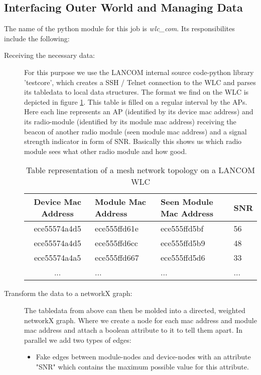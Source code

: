     \subsection{Interfacing Outer World and Managing Data}
      The name of the python module for this job is \textit{wlc\_com}. Its responsibilites include the following:
      \begin{description}
	\item[Receiving the necessary data:]
	  For this purpose we use the LANCOM internal source code-python library 'testcore', which creates a \ac{SSH} / Telnet connection to the 
	  \ac{WLC} and parses its tabledata to local data structures.
	  The format we find on the \ac{WLC} is depicted in figure \ref{tab:wlc}. This table is filled on a regular interval by the APs.
	  Here each line represents an \ac{AP} (identified by its device mac address) and its radio-module (identified by its module mac address) receiving the beacon
	  of another radio module (seen module mac address) and a signal strength indicator in form of \ac{SNR}. Basically this shows us which radio module 
	  sees what other radio module and how good.
	  \begin{table}[h!]
	    \begin{tabular}{clll}
	      Device Mac Address & Module Mac Address & Seen Module Mac Address & \ac{SNR}\\ \hline
	      ece55574a4d5 & ece555ffd61e & ece555ffd5bf & 56 \\
	      ece55574a4d5 & ece555ffd6cc & ece555ffd5b9 & 48 \\
	      ece55574a4a5 & ece555ffd667 & ece555ffd5d6 & 33 \\
	      ... & ... & ... & ...
	    \end{tabular}
	    \caption{Table representation of a mesh network topology on a LANCOM \ac{WLC}}
	    \label{tab:wlc}
	  \end{table}
	  
\newpage
	
	\item [Transform the data to a networkX graph:]
	  The tabledata from above can then be molded into a directed, weighted networkX graph. 
	  Where we create a node for each mac address and module mac address and attach a boolean attribute to it to tell them apart. 
	  In parallel we add two types of edges:

	  \begin{itemize}
	    \item Fake edges between module-nodes and device-nodes with an attribute "SNR" which contains the maximum possible value for this attribute.
	    

\end{itemize}
\end{description}
